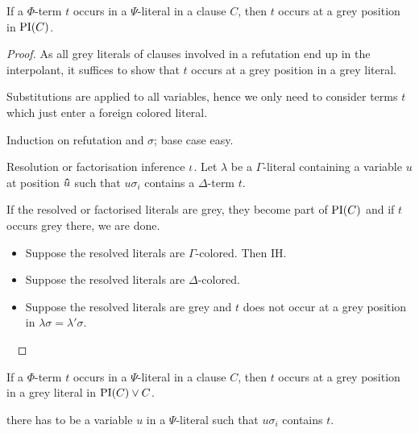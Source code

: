 \documentclass[,%
	draft=false,%
	numbers=noendperiod
	12pt,
	a4paper,
	oneside,%
	openany,
]{memoir}
\begin{document}
\begin{rlemma}
	If a $\Phi$-term $t$ occurs in a $\Psi$-literal in a clause $C$, then $t$ occurs at a grey position in $\operatorname{PI}(C)$.
\end{rlemma}
\begin{proof}
	As all grey literals of clauses involved in a refutation end up in the interpolant, it suffices to show that $t$ occurs at a grey position in a grey literal. 

	Substitutions are applied to all variables, hence we only need to consider terms $t$ which just enter a foreign colored literal.



	Induction on refutation and $\sigma$; base case easy.

	Resolution or factorisation inference $\iota$. 
	Let $\lambda$ be a $\Gamma$-literal containing a variable $u$ at position $\bm\hat u$ such that $u\sigma_i$ contains a $\Delta$-term $t$.

	If the resolved or factorised literals are grey, they become part of $\operatorname{PI}(C)$ and if $t$ occurs grey there, we are done.

	\begin{itemize}
		\item Suppose the resolved literals are $\Gamma$-colored. Then IH.
		\item Suppose the resolved literals are $\Delta$-colored.
			\mytodo{}
		\item Suppose the resolved literals are grey and $t$ does not occur at a grey position in $\lambda\sigma = \lambda'\sigma$.

			\mytodo{}

	\end{itemize}


	~




\end{proof}

\begin{clemma}
	If a $\Phi$-term $t$ occurs in a $\Psi$-literal in a clause $C$, then $t$ occurs at a grey position in a grey literal in $\operatorname{PI}(C) \lor C$.
\end{clemma}
there has to be a variable $u$ in a $\Psi$-literal such that $u\sigma_i$ contains $t$.
\end{document}
